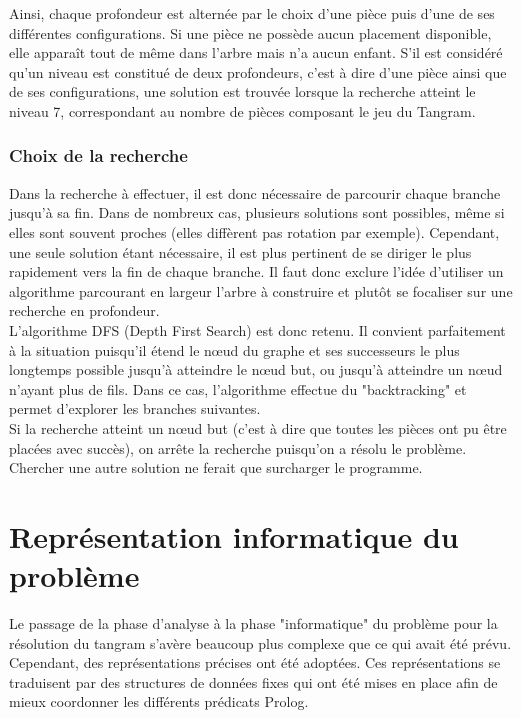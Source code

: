 \documentclass[a4paper, 11pt]{report}
\begin{document}
		Ainsi, chaque profondeur est alternée par le choix d'une pièce puis d'une de ses différentes configurations. Si une pièce ne possède aucun placement disponible, elle apparaît tout de même dans l'arbre mais n'a aucun enfant. S'il est considéré qu'un niveau est constitué de deux profondeurs, c'est à dire d'une pièce ainsi que de ses configurations, une solution est trouvée lorsque la recherche atteint le niveau 7, correspondant au nombre de pièces composant le
jeu du Tangram.

			\subsection{Choix de la recherche}

		Dans la recherche à effectuer, il est donc nécessaire de parcourir chaque branche jusqu'à sa fin. Dans de nombreux cas, plusieurs solutions sont possibles, m\^eme si elles sont souvent proches (elles diffèrent pas rotation par exemple). Cependant, une seule solution étant nécessaire, il est plus pertinent de se diriger le plus rapidement vers la fin de chaque branche. Il faut donc exclure l'idée d'utiliser un algorithme parcourant en largeur l'arbre à construire et plutôt se focaliser sur une recherche en profondeur.\\
		L'algorithme DFS (Depth First Search) est donc retenu. Il convient parfaitement à la situation puisqu'il étend le nœud du graphe et ses successeurs le plus longtemps possible jusqu'à atteindre le nœud but, ou jusqu'à atteindre un nœud
n'ayant plus de fils. Dans ce cas, l'algorithme effectue du "backtracking" et permet d'explorer les branches suivantes. \\
		Si la recherche atteint un nœud but (c'est à dire que toutes les pièces ont pu être placées avec succès), on arrête la recherche puisqu'on a résolu le problème. Chercher une autre solution ne ferait que surcharger le programme.


	\newpage
	
	\chapter{Représentation informatique du problème}
	
	Le passage de la phase d'analyse à la phase "informatique" du problème pour la résolution du tangram s'avère beaucoup plus complexe que ce qui avait été prévu. Cependant, des représentations précises ont été adoptées. Ces représentations se traduisent par des structures de données fixes qui ont été mises en place afin de mieux coordonner les différents prédicats Prolog.
\end{document}
